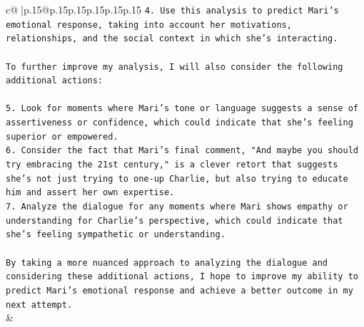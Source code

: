 \documentclass{article}
\begin{document}
{\begin{supertabular}{c@{$\;$}|p{.15\linewidth}@{}p{.15\linewidth}p{.15\linewidth}p{.15\linewidth}p{.15\linewidth}p{.15\linewidth}}
{{{\texttt{4. Use this analysis to predict Mari's emotional response, taking into account her motivations, relationships, and the social context in which she's interacting.} \\
\\ 
\texttt{To further improve my analysis, I will also consider the following additional actions:} \\
\\ 
\texttt{5. Look for moments where Mari's tone or language suggests a sense of assertiveness or confidence, which could indicate that she's feeling superior or empowered.} \\
\texttt{6. Consider the fact that Mari's final comment, "And maybe you should try embracing the 21st century," is a clever retort that suggests she's not just trying to one{-}up Charlie, but also trying to educate him and assert her own expertise.} \\
\texttt{7. Analyze the dialogue for any moments where Mari shows empathy or understanding for Charlie's perspective, which could indicate that she's feeling sympathetic or understanding.} \\
\\ 
\texttt{By taking a more nuanced approach to analyzing the dialogue and considering these additional actions, I hope to improve my ability to predict Mari's emotional response and achieve a better outcome in my next attempt.} \\
            }
        }
    }
    & \\ \\

\end{supertabular}
}
\end{document}
